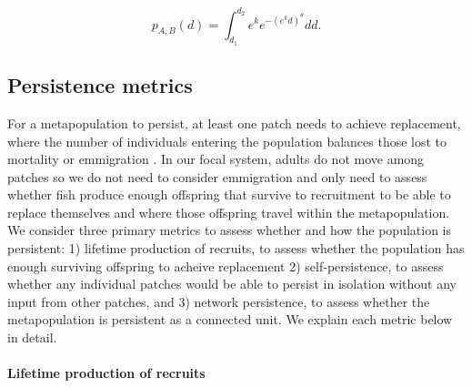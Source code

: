 \documentclass[12pt, oneside]{article}   	%
\begin{document}
\begin{equation} %
p_{A, B}(d) = \int_{d_1}^{d_2} e^k e^{-(e^k d)^\theta}  dd. \label{EQN_integratingDK}
\end{equation}

\subsection*{Persistence metrics}


For a metapopulation to persist, at least one patch needs to achieve replacement, where the number of individuals entering the population balances those lost to mortality or emmigration \citep{burgess2014beyond}. In our focal system, adults do not move among patches so we do not need to consider emmigration and only need to assess whether fish produce enough offspring that survive to recruitment to be able to replace themselves and where those offspring travel within the metapopulation. We consider three primary metrics to assess whether and how the population is persistent: 1) lifetime production of recruits, to assess whether the population has enough surviving offspring to acheive replacement 2) self-persistence, to assess whether any individual patches would be able to persist in isolation without any input from other patches, and 3) network persistence, to assess whether the metapopulation is persistent as a connected unit. We explain each metric below in detail. %


\paragraph*{Lifetime production of recruits}


\end{document}
